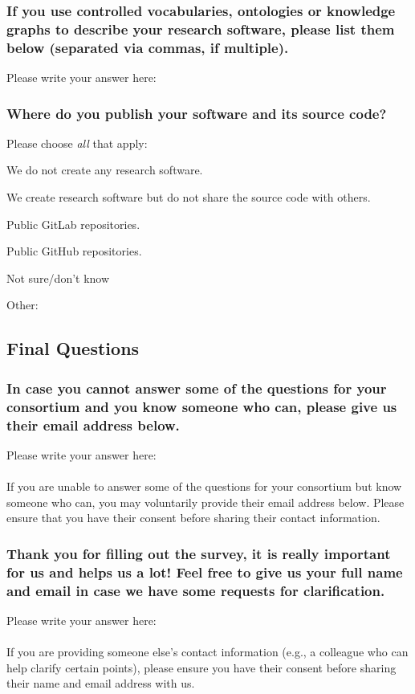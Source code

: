 \documentclass[headsepline,titlepage,twoside,12pt,toc=flat,headings=normal]{scrreprt}
\newcommand{\question}[1]{\subsubsection{#1}}
\newcommand{\otherbox}{\fbox{\phantom{This is how big an answer would be.}}}
\begin{document}
\question{If you use controlled vocabularies, ontologies or knowledge graphs to describe your research software, please list them below (separated via commas, if multiple).}
Please write your answer here: \otherbox

\question{Where do you publish your software and its source code?}
Please choose \emph{all} that apply:

\begin{answers}
\item We do not create any research software.
\item We create research software but do not share the source code with others.
\item Public GitLab repositories.
\item Public GitHub repositories.
\item Not sure/don't know
\item Other: \otherbox
\end{answers}

\subsection{Final Questions}\label{final-questions}

\question{In case you cannot answer some of the questions for your consortium and you know someone who can, please give us their email address below.}

Please write your answer here: \otherbox

\paragraph{}
If you are unable to answer some of the questions for your consortium but know someone who can, you may voluntarily provide their email address below.
Please ensure that you have their consent before sharing their contact information.

\question{Thank you for filling out the survey, it is really important for us and helps us a lot! Feel free to give us your full name and email in case we have some requests for clarification.}
Please write your answer here: \otherbox

\paragraph{}
If you are providing someone else's contact information (e.g., a colleague who can help clarify certain points), please ensure you have their consent before sharing their name and email address with us.
\end{document}
